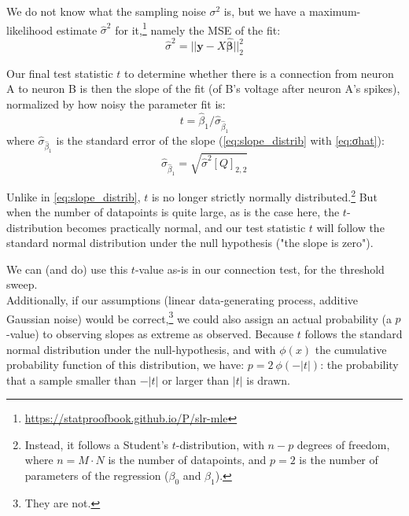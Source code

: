 We do not know what the sampling noise $σ^2$ is, but we have a maximum-likelihood estimate $\hat{σ}^2$ for it,\footnote{\url{https://statproofbook.github.io/P/slr-mle}} namely the MSE of the fit:
\begin{equation}\label{eq:σhat}
    \hat{σ}^2 = || \bm{y} - X \bm{\hat{β}} ||_2^2
\end{equation}

Our final test statistic $t$ to determine whether there is a connection from neuron A
to neuron B is then the slope of the fit (of B's voltage after neuron A's spikes), normalized by how noisy the parameter fit is:
\begin{equation}
    t = \hat{β}_1 / \hat{σ}_{\hat{β}_1}
\end{equation}
where $\hat{σ}_{\hat{β}_1}$ is the standard error of the slope (\cref{eq:slope_distrib} with \cref{eq:σhat}):
\begin{equation}
    \hat{σ}_{\hat{β}_1} = \sqrt{\hat{σ}^2 [Q]_{2,2}}
\end{equation}

Unlike in \cref{eq:slope_distrib}, $t$ is no longer strictly normally distributed.\footnote{
    Instead, it follows a Student's $t$-distribution, with $n - p$ degrees of freedom, where $n = M · N$ is the number of datapoints, and $p = 2$ is the number of parameters of the regression ($β_0$ and $β_1$).
}
But when the number of datapoints is quite large, as is the case here, the $t$-distribution becomes practically normal, and our test statistic $t$ will follow the standard normal distribution under the null hypothesis ("the slope is zero").

We can (and do) use this $t$-value as-is in our connection test, for the threshold sweep.\\
Additionally, if our assumptions (linear data-generating process, additive Gaussian noise) would be correct,\footnote{They are not.}
we could also assign an actual probability (a $p$-value) to observing slopes as extreme as observed. Because $t$ follows the standard normal distribution under the null-hypothesis, and with $\phi(x)$ the cumulative probability function of this distribution, we have: $p = 2\ \phi(-|t|)$: the probability that a sample smaller than $-|t|$ or larger than $|t|$ is drawn.


